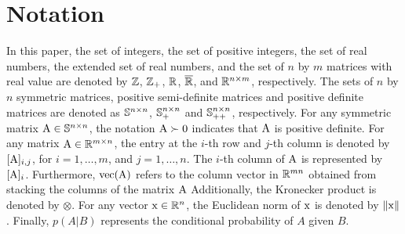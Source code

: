 \section{Notation} \label{sec:notation}
In this paper, the set of integers, the set of positive integers, the set of real numbers, the extended set of real numbers, and the set of $n$ by $m$ matrices with real value are denoted by ${\mathbb{Z}}$, ${\mathbb{Z}}_+$, ${\mathbb{R}}$, $\overline{{\mathbb{R}}}$, and ${\mathbb{R}}^{n\times m}$, respectively. 
%
The sets of $n$ by $n$ symmetric matrices, positive semi-definite matrices and positive definite matrices are denoted as ${\mathbb{S}}^{n\times n}$, ${\mathbb{S}}_{+}^{n\times n}$ and ${\mathbb{S}}_{++}^{n\times n}$, respectively. 
%
For any symmetric matrix ${ \mathrm{A} } \in {\mathbb{S}}^{n \times n}$, the notation ${ \mathrm{A} } \succ 0$ indicates that ${ \mathrm{A} }$ is positive definite.
%
For any matrix ${ \mathrm{A} } \in {\mathbb{R}}^{m\times n}$, the entry at the $i$-th row and $j$-th column is denoted by $[{ \mathrm{A} }]_{i,j}$, for $i=1,\ldots,m$, and $j=1,\ldots,n$. 
%
The $i$-th column of ${ \mathrm{A} }$ is represented by $[{ \mathrm{A} }]_i$. Furthermore, $\mathrm{vec}({ \mathrm{A} })$ refers to the column vector in ${\mathbb{R}}^{mn}$ obtained from stacking the columns of the matrix ${ \mathrm{A} }$
%
Additionally, the Kronecker product is denoted by $\otimes$. 
%
For any vector ${ \mathrm{x} } \in {\mathbb{R}}^n$, the Euclidean norm of ${ \mathrm{x} }$ is denoted by $\|{ \mathrm{x} }\|$. 
%
Finally,  $p(A|B)$ represents the conditional probability of $A$ given $B$.
%

   